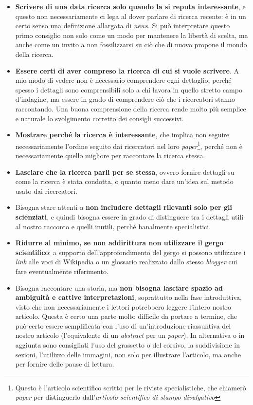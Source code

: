 \documentclass[12pt,a4paper]{article}
\begin{document}
 \begin{itemize}
 	\item \textbf{Scrivere di una data ricerca solo quando la si reputa interessante}, e questo non necessariamente ci lega al dover parlare di ricerca recente: è in un certo senso una definizione allargata di \emph{news}. Si può interpretare questo primo consiglio non solo come un modo per mantenere la libertà di scelta, ma anche come un invito a non fossilizzarsi su ciò che di nuovo propone il mondo della ricerca.
 	\item \textbf{Essere certi di aver compreso la ricerca di cui si vuole scrivere}. A mio modo di vedere non è necessario comprendere ogni dettaglio, perché spesso i dettagli sono comprensibili solo a chi lavora in quello stretto campo d'indagine, ma essere in grado di comprendere ciò che i ricercatori stanno raccontando. Una buona comprensione della ricerca rende molto più semplice e naturale lo svolgimento corretto dei consigli successivi.
 	\item \textbf{Mostrare perché la ricerca è interessante}, che implica non seguire necessariamente l'ordine seguito dai ricercatori nel loro \emph{paper}\footnote{Questo è l'articolo scientifico scritto per le riviste specialistiche, che chiamerò \emph{paper} per distinguerlo dall'\emph{articolo scientifico di stampo divulgativo}}, perché non è necessariamente quello migliore per raccontare la ricerca stessa.
 	\item \textbf{Lasciare che la ricerca parli per se stessa}, ovvero fornire dettagli su come la ricerca è stata condotta, o quanto meno dare un'idea sul metodo usato dai ricercatori.
 	\item Bisogna stare attenti a \textbf{non includere dettagli rilevanti solo per gli scienziati}, e quindi bisogna essere in grado di distinguere tra i dettagli utili al nostro racconto e quelli inutili, perché banalmente specialistici.
 	\item \textbf{Ridurre al minimo, se non addirittura non utilizzare il gergo scientifico}: a supporto dell'approfondimento del gergo si possono utilizzare i \emph{link} alle voci di Wikipedia o un glossario realizzato dallo stesso \emph{blogger} cui fare eventualmente riferimento.
 	\item Bisogna raccontare una storia, ma \textbf{non bisogna lasciare spazio ad ambiguità e cattive interpretazioni}, soprattutto nella fase introduttiva, visto che non necessariamente i lettori potrebbero leggere l'intero nostro articolo. Questa è certo una parte molto difficile da portare a termine, che può certo essere semplificata con l'uso di un'introduzione riassuntiva del nostro articolo (l'equivalente di un \emph{abstract} per un \emph{paper}). In alternativa o in aggiunta sono consigliati l'uso del grassetto o del corsivo, la suddivisione in sezioni, l'utilizzo delle immagini, non solo per illustrare l'articolo, ma anche per fornire delle pause di lettura.
 \end{itemize}
\end{document}
